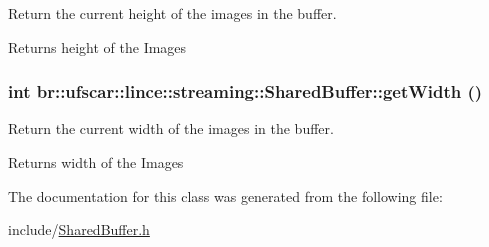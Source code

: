 Return the current height of the images in the buffer. 

\begin{DoxyReturn}{Returns}
height of the Images 
\end{DoxyReturn}
\hypertarget{classbr_1_1ufscar_1_1lince_1_1streaming_1_1SharedBuffer_a80a2f60b900c8e7a440b1ad12a03e5d2}{
\subsubsection[{getWidth}]{\setlength{\rightskip}{0pt plus 5cm}int br::ufscar::lince::streaming::SharedBuffer::getWidth ()}}
\label{classbr_1_1ufscar_1_1lince_1_1streaming_1_1SharedBuffer_a80a2f60b900c8e7a440b1ad12a03e5d2}


Return the current width of the images in the buffer. 

\begin{DoxyReturn}{Returns}
width of the Images 
\end{DoxyReturn}


The documentation for this class was generated from the following file:\begin{DoxyCompactItemize}
\item 
include/\hyperlink{SharedBuffer_8h}{SharedBuffer.h}\end{DoxyCompactItemize}
